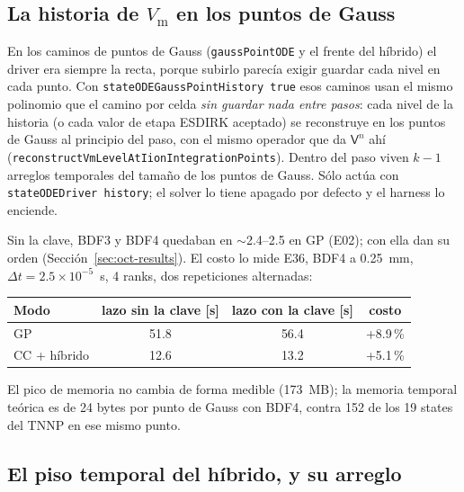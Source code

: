 \documentclass[11pt,a4paper]{article}
\newcommand{\code}[1]{\texttt{\small #1}}
\newcommand{\Vm}{V_{\text{m}}}
\newcommand{\dictkey}[1]{\textcolor{black!60!green}{\texttt{\footnotesize #1}}}
\begin{document}
\subsection{La historia de \texorpdfstring{$\Vm$}{Vm} en los puntos de Gauss}
\label{sec:oct-gausshist}

En los caminos de puntos de Gauss (\code{gaussPointODE} y el frente del híbrido)
el driver era siempre la recta, porque subirlo parecía exigir guardar cada nivel
en cada punto. Con \dictkey{stateODEGaussPointHistory true} esos caminos usan el
mismo polinomio que el camino por celda \emph{sin guardar nada entre pasos}: cada
nivel de la historia (o cada valor de etapa ESDIRK aceptado) se reconstruye en los
puntos de Gauss al principio del paso, con el mismo operador que da $\mathsf{V}^n$
ahí (\code{reconstructVmLevelAtIionIntegrationPoints}). Dentro del paso viven
$k-1$ arreglos temporales del tamaño de los puntos de Gauss. Sólo actúa con
\code{stateODEDriver history}; el solver lo tiene apagado por defecto y el
harness lo enciende.

Sin la clave, BDF3 y BDF4 quedaban en $\sim$2.4--2.5 en GP (E02); con ella dan su
orden (Sección~\ref{sec:oct-results}). El costo lo mide E36, BDF4 a 0.25~mm,
$\Delta t=2.5\times10^{-5}$~s, 4 ranks, dos repeticiones alternadas:

\begin{center}
\begin{tabular}{@{}lccc@{}}
\toprule
Modo & lazo sin la clave [s] & lazo con la clave [s] & costo \\
\midrule
GP           & 51.8 & 56.4 & +8.9\,\% \\
CC + híbrido & 12.6 & 13.2 & +5.1\,\% \\
\bottomrule
\end{tabular}
\end{center}

El pico de memoria no cambia de forma medible (173~MB); la memoria temporal
teórica es de 24 bytes por punto de Gauss con BDF4, contra 152 de los 19 states
del TNNP en ese mismo punto.

\subsection{El piso temporal del híbrido, y su arreglo}
\label{sec:oct-hybrid}
\end{document}
